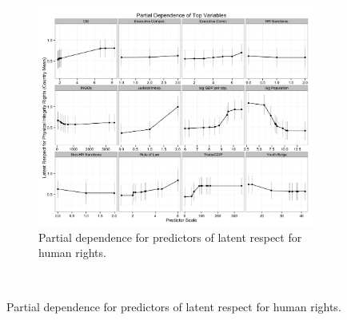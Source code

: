 \begin{figure}
        \centering
        \begin{subfigure}[b]{0.5\textwidth}
                \includegraphics[width=\textwidth]{figures/latent_pd.png}
                \caption{Partial dependence for predictors of latent respect for human rights.}
                \label{fig:latent_pd}
        \end{subfigure}%
        ~ %


\end{figure}
